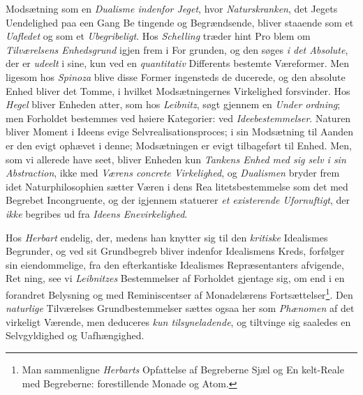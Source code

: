 Modsætning som en \emph{Dualisme indenfor Jeget}, hvor
\emph{Naturskranken}, det Jegets Uendelighed paa een Gang Be\-%
tingende og Begrændsende, bliver staaende som et \emph{Uafledet}
og som et \emph{Ubegribeligt}. Hos \emph{Schelling} træder hint Pro\-%
blem om \emph{Tilværelsens Enhedsgrund} igjen frem i For\-%
grunden, og den søges \emph{i det Absolute}, der er \emph{udeelt} i sine,
kun ved en \emph{quantitativ} Differents bestemte Væreformer.
Men ligesom hos \emph{Spinoza} blive disse Former ingensteds de\-%
ducerede, og den absolute Enhed bliver det Tomme, i hvilket
Modsætningernes Virkelighed forsvinder. Hos \emph{Hegel} bliver
Enheden atter, som hos \emph{Leibnitz}, søgt gjennem en \emph{Under\-%
ordning}; men Forholdet bestemmes ved høiere Kategorier:
ved \emph{Ideebestemmelser}. Naturen bliver Moment i Ideens
evige Selvrealisationsproces; i sin Modsætning til Aanden er
den evigt ophævet i denne; Modsætningen er evigt tilbageført
til Enhed. Men, som vi allerede have seet, bliver Enheden
kun \emph{Tankens Enhed med sig selv i sin Abstraction},
ikke med \emph{Værens concrete Virkelighed}, og \emph{Dualismen}
bryder frem idet Naturphilosophien sætter Væren i dens Rea\-%
litetsbestemmelse som det med Begrebet Incongruente, og der\-%
igjennem statuerer \emph{et existerende Ufornuftigt}, der \emph{ikke}
begribes ud fra \emph{Ideens Enevirkelighed}.

Hos \emph{Herbart} endelig, der, medens han knytter sig til
den \emph{kritiske} Idealismes Begrunder, og ved sit Grundbegreb
bliver indenfor Idealismens Kreds, forfølger sin eiendommelige,
fra den efterkantiske Idealismes Repræsentanters afvigende, Ret\-%
ning, see vi \emph{Leibnitzes} Bestemmelser af Forholdet gjentage
sig, om end i en forandret Belysning og med Reminiscentser
af Monadelærens Fortsættelser\footnote{Man sammenligne \emph{Herbarts} Opfattelse af Begreberne Sjæl og En\-%
kelt-Reale med Begreberne: forestillende Monade og Atom.}. Den \emph{naturlige} Tilværelses
 Grundbestemmelser sættes ogsaa her som \emph{Phænomen} af det
virkeligt Værende, men deduceres \emph{kun tilsyneladende}, og
tiltvinge sig saaledes en Selvgyldighed og Uafhængighed.

